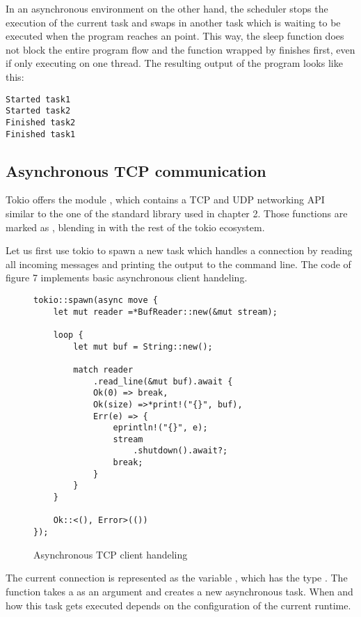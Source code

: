 In an asynchronous environment on the other hand, the scheduler stops the execution of the current task and swaps in
another task which is waiting to be executed when the program reaches an  point. This way, the sleep
function does not block the entire program flow and the function wrapped by  finishes first, even if only
executing on one thread. The resulting output of the program looks like this:

\begin{verbatim}
Started task1
Started task2
Finished task2
Finished task1
\end{verbatim}

\subsection{Asynchronous TCP communication}
Tokio offers the module , which contains a TCP and UDP networking API similar to the one of the
standard library used in chapter 2. Those functions are marked as , blending in with the rest of the tokio
ecosystem.

Let us first use tokio to spawn a new task which handles a connection by reading all incoming messages and printing the
output to the command line. The code of figure 7 implements basic asynchronous client handeling.

\begin{figure}[ht]
    \begin{verbatim}
tokio::spawn(async move {
    let mut reader =*BufReader::new(&mut stream);

    loop {
        let mut buf = String::new();

        match reader
            .read_line(&mut buf).await {
            Ok(0) => break,
            Ok(size) =>*print!("{}", buf),
            Err(e) => {
                eprintln!("{}", e);
                stream
                    .shutdown().await?;
                break;
            }
        }
    }

    Ok::<(), Error>(())
});
    \end{verbatim}
    \caption{Asynchronous TCP client handeling}
\end{figure}

The current connection is represented as the variable , which has the type .
The function  takes a  as an argument and creates a new asynchronous task. When and how
this task gets executed depends on the configuration of the current runtime.

